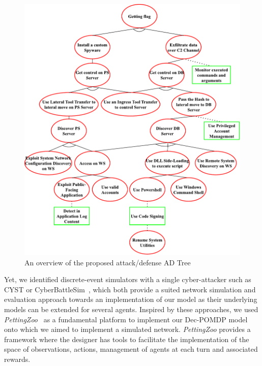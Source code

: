 \begin{figure}
    \centering
    \includegraphics[width=\linewidth]{figures/ADTree.pdf}
    \caption{An overview of the proposed attack/defense AD Tree}
    \label{fig:ADTree}
\end{figure}

Yet, we identified discrete-event simulators with a single cyber-attacker such as CYST\cite{drasar_session-level_2020} or CyberBattleSim~\cite{cyberbattlesim}, which both provide a suited network simulation and evaluation approach towards an implementation of our model as their underlying models can be extended for several agents. Inspired by these approaches, we used \textit{PettingZoo}~\cite{jk2020} as a fundamental platform to implement our Dec-POMDP model onto which we aimed to implement a simulated network. \textit{PettingZoo} provides a framework where the designer has tools to facilitate the implementation of the space of observations, actions, management of agents at each turn and associated rewards.


